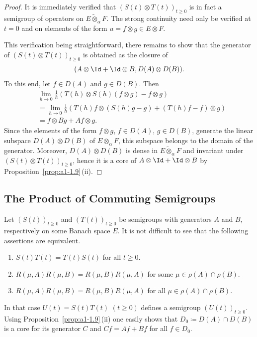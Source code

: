 \begin{proof}
It is immediately verified that $(S(t)\otimes T(t))_{t\geq 0}$ is in fact a semigroup of operators on 
$ E \widetilde{\otimes}_{\alpha} F $. 
The strong continuity need only be verified at $t = 0$ and on elements of the form $u = f \otimes g \in E \otimes F$.

This verification being straightforward, there remains to show that the generator of\/ $(S(t)\otimes T(t))_{t\geq 0}$ is obtained as the closure of 
%
\[
	(A \otimes \Id + \Id \otimes B,D(A) \otimes D(B)) .
\]
%
To this end, let $f \in D(A)$ and $g \in D(B)$. 
Then
\begin{align*}
    &\lim_{h\to 0} \frac{1}{h}(T(h) \otimes S(h)(f \otimes g)-f \otimes g) \\
    &= \lim_{h\to 0} \frac{1}{h}(T(h)f \otimes (S(h)g-g) + (T(h)f-f) \otimes g) \\
    &= f \otimes Bg + Af \otimes g.
\end{align*}
Since the elements of the form $f \otimes g$, $f \in D(A)$, $g \in D(B)$, generate the linear subspace $D(A) \otimes D(B)$ of\/ $E \otimes_{\alpha} F$, this subspace belongs to the domain of the generator.
Moreover, $D(A) \otimes D(B)$ is dense in $E \widetilde{\otimes}_{\alpha} F$ and invariant under $(S(t)\otimes T(t))_{t\geq 0}$, hence it is a core of\/ $A \otimes \Id + \Id \otimes B$ by Proposition~\ref{prop:a1-1.9}\,(ii).
\end{proof}
\subsection{The Product of Commuting Semigroups}\label{subsec:a1-3.9}%
Let $(S(t))_{t\geq 0}$ and $(T(t))_{t\geq 0}$ be semigroups with generators $A$ and $B$, respectively on some Banach space $E$.
It is not difficult to see that the following assertions are equivalent.
\begin{enumerate}[\upshape (a)]

\item  
$S(t)T(t) = T(t)S(t)$ for all $t \geq 0$.

\item 
$R(\mu,A)R(\mu,B) = R(\mu,B)R(\mu,A)$ for some $\mu \in \rho(A) \cap \rho(B)$.

\item 
$R(\mu,A)R(\mu,B) = R(\mu,B)R(\mu,A)$ for all $\mu \in \rho(A) \cap \rho(B)$.

\end{enumerate}
In that case $U(t) = S(t)T(t)$ $(t \geq 0)$ defines a semigroup $(U(t))_{t\geq 0}$.
Using %
Proposition~\ref{prop:a1-1.9}\,(ii) one easily shows that $D_{0} \coloneqq D(A) \cap D(B)$ is a core for its generator $C$ and $Cf = Af + Bf$ for all $f \in D_{0}$.
